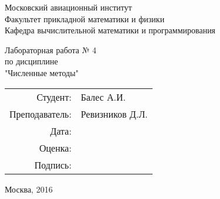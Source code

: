 \thispagestyle{empty}

\begin{center}
Московский авиационный институт\\
\vspace{0.5cm}
Факультет прикладной математики и физики\\
\vspace{0.5cm}
Кафедра вычислительной математики и программирования\\

\vspace{3cm}

Лабораторная работа № 4\\
по дисциплине\\
"Численные методы"\\
\end{center}

\vspace{3cm}

\begin{flushright}
\begin{tabular}{rl}
Студент: & Балес А.И.\\
Преподаватель: & Ревизников Д.Л. \\
Дата: & \\
Оценка: & \\
Подпись: & \\
\end{tabular}
\end{flushright}

\vspace{5cm}

\begin{center}
Москва, 2016
\end{center}

\pagebreak
